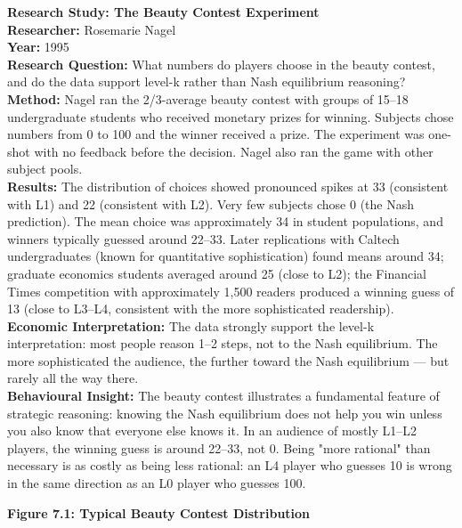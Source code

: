 \documentclass[12pt, letterpaper]{article}
\begin{document}
\begin{researchbox}
\textbf{Research Study: The Beauty Contest Experiment}\\[4pt]

\textbf{Researcher:} Rosemarie Nagel\\[4pt]
\textbf{Year:} 1995\\[4pt]
\textbf{Research Question:} What numbers do players choose in the beauty contest, and do the data support level-k rather than Nash equilibrium reasoning?\\[4pt]
\textbf{Method:} Nagel ran the 2/3-average beauty contest with groups of 15--18 undergraduate students who received monetary prizes for winning. Subjects chose numbers from 0 to 100 and the winner received a prize. The experiment was one-shot with no feedback before the decision. Nagel also ran the game with other subject pools.\\[4pt]
\textbf{Results:} The distribution of choices showed pronounced spikes at 33 (consistent with L1) and 22 (consistent with L2). Very few subjects chose 0 (the Nash prediction). The mean choice was approximately 34 in student populations, and winners typically guessed around 22--33. Later replications with Caltech undergraduates (known for quantitative sophistication) found means around 34; graduate economics students averaged around 25 (close to L2); the Financial Times competition with approximately 1,500 readers produced a winning guess of 13 (close to L3--L4, consistent with the more sophisticated readership).\\[4pt]
\textbf{Economic Interpretation:} The data strongly support the level-k interpretation: most people reason 1--2 steps, not to the Nash equilibrium. The more sophisticated the audience, the further toward the Nash equilibrium --- but rarely all the way there.\\[4pt]
\textbf{Behavioural Insight:} The beauty contest illustrates a fundamental feature of strategic reasoning: knowing the Nash equilibrium does not help you win unless you also know that everyone else knows it. In an audience of mostly L1--L2 players, the winning guess is around 22--33, not 0. Being "more rational" than necessary is as costly as being less rational: an L4 player who guesses 10 is wrong in the same direction as an L0 player who guesses 100.\\[4pt]
\end{researchbox}
\newpage
\textbf{Figure 7.1: Typical Beauty Contest Distribution}
\end{document}
